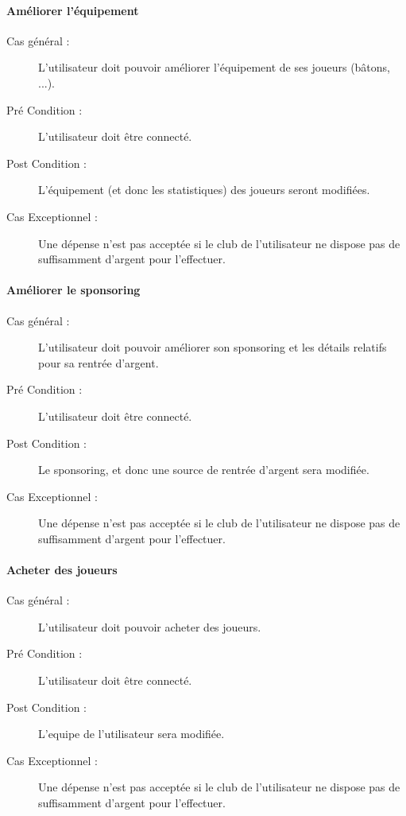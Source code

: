 \documentclass[a4paper]{article}
\begin{document}
\paragraph{Améliorer l'équipement}
\begin{description}
    \item[Cas général :] L'\gls{utilisateur} doit pouvoir améliorer l'équipement de ses \glspl{joueur} (bâtons, ...).
    \item[Pré Condition  :] L'\gls{utilisateur} doit être connecté.
    \item[Post Condition :] L'équipement (et donc les statistiques) des \glspl{joueur} seront modifiées.
    \item[Cas Exceptionnel :] Une dépense n'est pas acceptée si le \gls{club} de l'\gls{utilisateur} ne dispose pas de suffisamment d'argent pour l'effectuer.
\end{description}
\paragraph{Améliorer le sponsoring}
\begin{description}
\item[Cas général :] L'\gls{utilisateur} doit pouvoir améliorer son sponsoring et les détails relatifs pour sa rentrée d'argent.
\item[Pré Condition  :] L'\gls{utilisateur} doit être connecté.
\item[Post Condition :] Le sponsoring, et donc une source de rentrée d'argent sera modifiée.
\item[Cas Exceptionnel :] Une dépense n'est pas acceptée si le \gls{club} de l'\gls{utilisateur} ne dispose pas de suffisamment d'argent pour l'effectuer.
\end{description}
\paragraph{Acheter des \glspl{joueur}}
\begin{description}
    \item[Cas général :] L'\gls{utilisateur} doit pouvoir acheter des \glspl{joueur}.
    \item[Pré Condition  :] L'\gls{utilisateur} doit être connecté.
    \item[Post Condition :] L'\gls{equipe} de l'\gls{utilisateur} sera modifiée.
    \item[Cas Exceptionnel :] Une dépense n'est pas acceptée si le \gls{club} de l'\gls{utilisateur} ne dispose pas de suffisamment d'argent pour l'effectuer.
\end{description}
\end{document}
